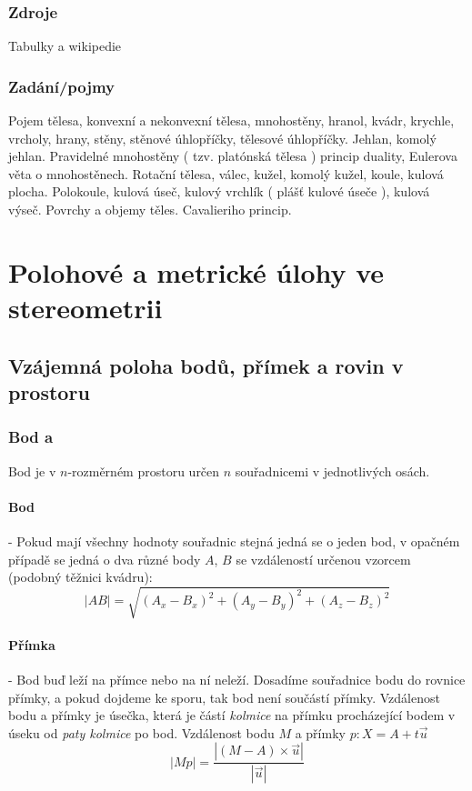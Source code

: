 \documentclass[12pt]{article}
\begin{document}
\subsubsection{Zdroje}
Tabulky a wikipedie
\subsubsection{Zadání/pojmy}
Pojem tělesa, konvexní a nekonvexní tělesa, mnohostěny, hranol, kvádr, krychle, vrcholy, hrany, stěny, stěnové úhlopříčky, tělesové úhlopříčky. Jehlan, komolý jehlan. Pravidelné mnohostěny ( tzv. platónská tělesa ) princip duality, Eulerova věta o mnohostěnech. Rotační tělesa, válec, kužel, komolý kužel, koule, kulová plocha. Polokoule, kulová úseč, kulový vrchlík ( plášť kulové úseče ), kulová výseč. Povrchy a objemy těles. Cavalieriho princip.

\section{Polohové a metrické úlohy ve stereometrii}
\label{sec:18}
\subsection{Vzájemná poloha bodů, přímek a rovin v prostoru}
\label{sec:stereo_polohy}
\subsubsection{Bod a}
\label{sec:stereo_polohy-bod}
Bod je v $n$-rozměrném prostoru určen $n$ souřadnicemi v jednotlivých osách.
\paragraph{Bod} - Pokud mají všechny hodnoty souřadnic stejná jedná se o jeden bod, v opačném případě se jedná o dva různé body $A$, $B$ se vzdáleností určenou vzorcem (podobný těžnici kvádru):
\begin{equation}
\label{eq:vzdalenost_bodu}
|AB| = \sqrt{(A_x-B_x)^2 + (A_y-B_y)^2 + (A_z-B_z)^2}
\end{equation}
\paragraph{Přímka} - Bod buď leží na přímce nebo na ní neleží. Dosadíme souřadnice bodu do rovnice přímky, a pokud dojdeme ke sporu, tak bod není součástí přímky. Vzdálenost bodu a přímky je úsečka, která je částí \emph{kolmice} na přímku procházející bodem v úseku od \emph{paty kolmice} po bod. Vzdálenost bodu $M$ a přímky $p: X = A + t \vec{u}$
\begin{equation}
|Mp| = \frac{|(M-A)\times \vec{u}|}{|\vec{u}|}
\end{equation}
\end{document}

